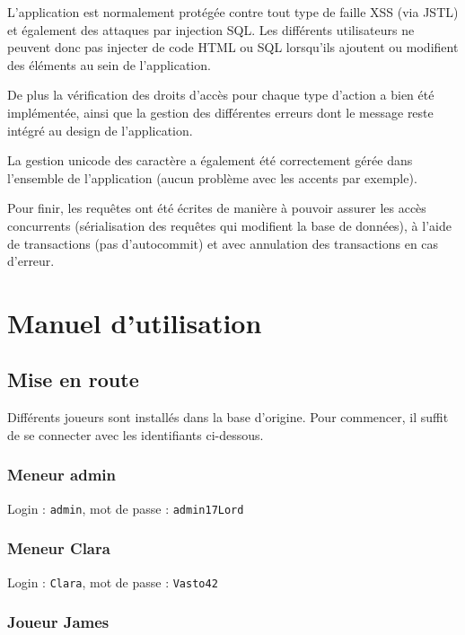 \documentclass[a4paper, 11pt, titlepage]{article}
\begin{document}
L'application est normalement protégée contre tout type de faille XSS (via JSTL) et également des attaques par injection SQL. Les différents utilisateurs ne peuvent donc pas injecter de code HTML ou SQL lorsqu'ils ajoutent ou modifient des éléments au sein de l'application.

De plus la vérification des droits d'accès pour chaque type d'action a bien été implémentée, ainsi que la gestion des différentes erreurs dont le message reste intégré au design de l'application.

La gestion unicode des caractère a également été correctement gérée dans l'ensemble de l'application (aucun problème avec les accents par exemple).

Pour finir, les requêtes ont été écrites de manière à pouvoir assurer les accès concurrents (sérialisation des requêtes qui modifient la base de données), à l'aide de transactions (pas d'autocommit) et avec annulation des transactions en cas d'erreur.



\section {Manuel d'utilisation}

\subsection {Mise en route}

Différents joueurs sont installés dans la base d'origine.
Pour commencer, il suffit de se connecter avec les identifiants ci-dessous.

\subsubsection {Meneur admin}

Login : \lstinline!admin!, mot de passe : \lstinline!admin17Lord!


\subsubsection {Meneur Clara}

Login : \lstinline!Clara!, mot de passe : \lstinline!Vasto42!


\subsubsection {Joueur James}
\end{document}
